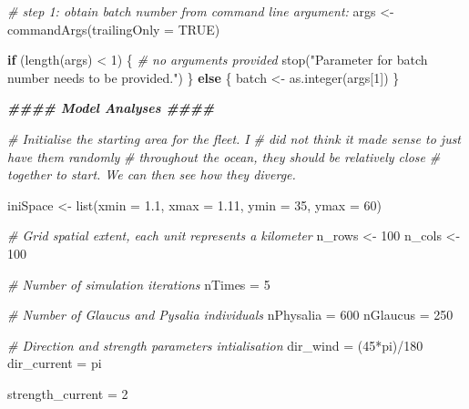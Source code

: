 \documentclass[
]{article}
\newenvironment{Shaded}{\begin{snugshade}}{\end{snugshade}}
\newcommand{\AttributeTok}[1]{\textcolor[rgb]{0.77,0.63,0.00}{#1}}
\newcommand{\CommentTok}[1]{\textcolor[rgb]{0.56,0.35,0.01}{\textit{#1}}}
\newcommand{\ConstantTok}[1]{\textcolor[rgb]{0.00,0.00,0.00}{#1}}
\newcommand{\ControlFlowTok}[1]{\textcolor[rgb]{0.13,0.29,0.53}{\textbf{#1}}}
\newcommand{\DecValTok}[1]{\textcolor[rgb]{0.00,0.00,0.81}{#1}}
\newcommand{\DocumentationTok}[1]{\textcolor[rgb]{0.56,0.35,0.01}{\textbf{\textit{#1}}}}
\newcommand{\FloatTok}[1]{\textcolor[rgb]{0.00,0.00,0.81}{#1}}
\newcommand{\FunctionTok}[1]{\textcolor[rgb]{0.00,0.00,0.00}{#1}}
\newcommand{\NormalTok}[1]{#1}
\newcommand{\OtherTok}[1]{\textcolor[rgb]{0.56,0.35,0.01}{#1}}
\newcommand{\SpecialCharTok}[1]{\textcolor[rgb]{0.00,0.00,0.00}{#1}}
\newcommand{\StringTok}[1]{\textcolor[rgb]{0.31,0.60,0.02}{#1}}
\begin{document}
\begin{Shaded}
\begin{Highlighting}[]
\CommentTok{\# step 1: obtain batch number from command line argument:}
\NormalTok{args }\OtherTok{\textless{}{-}} \FunctionTok{commandArgs}\NormalTok{(}\AttributeTok{trailingOnly =} \ConstantTok{TRUE}\NormalTok{)}

\ControlFlowTok{if}\NormalTok{ (}\FunctionTok{length}\NormalTok{(args) }\SpecialCharTok{\textless{}} \DecValTok{1}\NormalTok{) \{ }\CommentTok{\# no arguments provided}
  \FunctionTok{stop}\NormalTok{(}\StringTok{"Parameter for batch number needs to be provided."}\NormalTok{)}
\NormalTok{\} }\ControlFlowTok{else}\NormalTok{ \{}
\NormalTok{  batch }\OtherTok{\textless{}{-}} \FunctionTok{as.integer}\NormalTok{(args[}\DecValTok{1}\NormalTok{])}
\NormalTok{\}}

\DocumentationTok{\#\#\#\# Model Analyses \#\#\#\#}

\CommentTok{\# Initialise the starting area for the fleet. I}
\CommentTok{\# did not think it made sense to just have them randomly}
\CommentTok{\# throughout the ocean, they should be relatively close}
\CommentTok{\# together to start. We can then see how they diverge.}

\NormalTok{iniSpace }\OtherTok{\textless{}{-}} \FunctionTok{list}\NormalTok{(}\AttributeTok{xmin =} \FloatTok{1.1}\NormalTok{,}
                 \AttributeTok{xmax =} \FloatTok{1.11}\NormalTok{,}
                 \AttributeTok{ymin =} \DecValTok{35}\NormalTok{,}
                 \AttributeTok{ymax =} \DecValTok{60}\NormalTok{)}

\CommentTok{\# Grid spatial extent, each unit represents a kilometer}
\NormalTok{n\_rows }\OtherTok{\textless{}{-}} \DecValTok{100}
\NormalTok{n\_cols }\OtherTok{\textless{}{-}} \DecValTok{100}

\CommentTok{\# Number of simulation iterations}
\NormalTok{nTimes }\OtherTok{=} \DecValTok{5}

\CommentTok{\# Number of Glaucus and Pysalia individuals}
\NormalTok{nPhysalia }\OtherTok{=} \DecValTok{600}
\NormalTok{nGlaucus }\OtherTok{=} \DecValTok{250}

\CommentTok{\# Direction and strength parameters intialisation}
\NormalTok{dir\_wind }\OtherTok{=}\NormalTok{ (}\DecValTok{45}\SpecialCharTok{*}\NormalTok{pi)}\SpecialCharTok{/}\DecValTok{180}
\NormalTok{dir\_current }\OtherTok{=}\NormalTok{ pi}

\NormalTok{strength\_current }\OtherTok{=} \DecValTok{2}


\end{Highlighting}
\end{Shaded}
\end{document}
